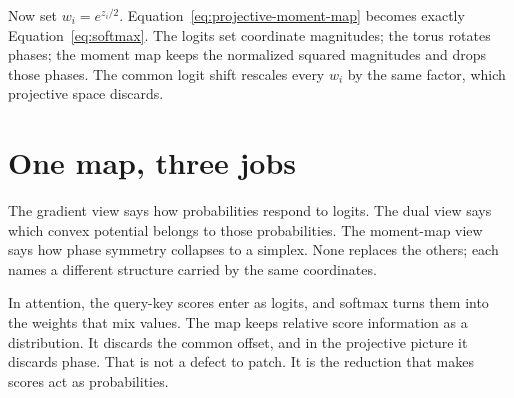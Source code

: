 Now set $w_i=e^{z_i/2}$. Equation~\ref{eq:projective-moment-map} becomes
exactly Equation~\ref{eq:softmax}. The logits set coordinate magnitudes;
the torus rotates phases; the moment map keeps the normalized squared
magnitudes and drops those phases. The common logit shift rescales every
$w_i$ by the same factor, which projective space discards.

\section{One map, three jobs}

The gradient view says how probabilities respond to logits. The dual view
says which convex potential belongs to those probabilities. The moment-map
view says how phase symmetry collapses to a simplex. None replaces the
others; each names a different structure carried by the same coordinates.

In attention, the query-key scores enter as logits, and softmax turns them
into the weights that mix values. The map keeps relative score information
as a distribution. It discards the common offset, and in the projective
picture it discards phase. That is not a defect to patch. It is the
reduction that makes scores act as probabilities.
